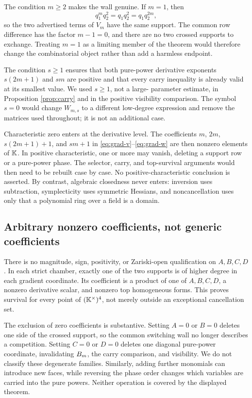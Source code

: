 \documentclass[11pt]{article}
\theoremstyle{definition}
\theoremstyle{remark}
\begin{document}
The condition \(m\geq2\) makes the wall genuine.  If \(m=1\), then
\[
q_1^m q_2^2=q_1q_2^2=q_1q_2^{2m},
\]
so the two advertised terms of \(V_m\) have the same support.  The common
row difference has the factor \(m-1=0\), and there are no two crossed
supports to exchange.  Treating \(m=1\) as a limiting member of the theorem
would therefore change the combinatorial object rather than add a harmless
endpoint.

The condition \(s\geq1\) ensures that both pure-power derivative exponents
\(s(2m+1)\) and \(sm\) are positive and that every carry inequality is
already valid at its smallest value.  We used \(s\geq1\), not a large-
parameter estimate, in Proposition \ref{prop:carry} and in the positive
visibility comparison.  The symbol \(s=0\) would change \(W_{m,s}\) to a
different low-degree expression and remove the matrices used throughout; it
is not an additional case.

Characteristic zero enters at the derivative level.  The coefficients
\(m\), \(2m\), \(s(2m+1)+1\), and \(sm+1\) in
\eqref{eq:grad-v}--\eqref{eq:grad-w} are then nonzero elements of \(\mathbb{K}\).
In positive characteristic, one or more may vanish, deleting a support row or
a pure-power phase.  The selector, carry, and top-survival arguments would
then need to be rebuilt case by case.  No positive-characteristic conclusion
is asserted.  By contrast, algebraic closedness never enters: inversion uses
subtraction, symplecticity uses symmetric Hessians, and noncancellation uses
only that a polynomial ring over a field is a domain.

\subsection{Arbitrary nonzero coefficients, not generic coefficients}

There is no magnitude, sign, positivity, or Zariski-open qualification on
\(A,B,C,D\).  In each strict chamber, exactly one of the two supports is of
higher degree in each gradient coordinate.  Its coefficient is a product of
one of \(A,B,C,D\), a nonzero derivative scalar, and nonzero top homogeneous
forms.  This proves survival for every point of \((\mathbb{K}^\times)^4\), not merely
outside an exceptional cancellation set.

The exclusion of zero coefficients is substantive.  Setting \(A=0\) or
\(B=0\) deletes one side of the crossed support, so the common switching wall
no longer describes a competition.  Setting \(C=0\) or \(D=0\) deletes one
diagonal pure-power coordinate, invalidating \(B_m\), the carry comparison,
and visibility.  We do not classify these degenerate families.  Similarly,
adding further monomials can introduce new faces, while reversing the phase
order changes which variables are carried into the pure powers.  Neither
operation is covered by the displayed theorem.
\end{document}
